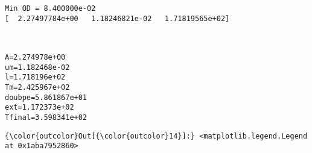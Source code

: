 \documentclass[11pt]{article}
\begin{document}
    \begin{Verbatim}[commandchars=\\\{\}]
Min OD = 8.400000e-02
[  2.27497784e+00   1.18246821e-02   1.71819565e+02]

    \end{Verbatim}

    \begin{center}
    \end{center}
    { \hspace*{\fill} \\}
    
    \begin{Verbatim}[commandchars=\\\{\}]
A=2.274978e+00
um=1.182468e-02
l=1.718196e+02
Tm=2.425967e+02
doubpe=5.861867e+01
ext=1.172373e+02
Tfinal=3.598341e+02

    \end{Verbatim}

            \begin{Verbatim}[commandchars=\\\{\}]
{\color{outcolor}Out[{\color{outcolor}14}]:} <matplotlib.legend.Legend at 0x1aba7952860>
\end{Verbatim}
        
    \begin{center}
    \end{center}
    { \hspace*{\fill} \\}
    
    \begin{center}
    \end{center}
    { \hspace*{\fill} \\}
    
\end{document}
